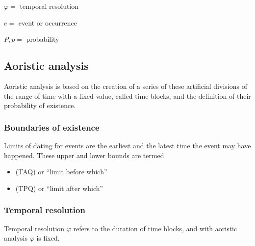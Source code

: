 \documentclass[a4paper,12pt,english]{sphinxhowto}
\begin{document}
\(\varphi =\) temporal resolution

\(e =\) event or occurrence

\(P, p =\) probability




\subsection{Aoristic analysis}
\label{\detokenize{Uncertainty:aoristic-analysis}}\label{\detokenize{Uncertainty:aora}}
Aoristic analysis is based on the creation of a series of these artificial divisions of
the range of time with a fixed value, called time blocks, and the definition of their probability of existence.



\subsubsection{Boundaries of existence}
\label{\detokenize{Uncertainty:boundaries-of-existence}}\label{\detokenize{Uncertainty:tapq}}
Limits of dating for events are the earliest and the latest time the event may have happened.
These upper and lower bounds are termed
\begin{itemize}
\item {} 
 (TAQ) or “limit before which”

\item {} 
 (TPQ) or “limit after which”

\end{itemize}



\subsubsection{Temporal resolution}
\label{\detokenize{Uncertainty:temporal-resolution}}
Temporal resolution \(\varphi\) refers to the duration of time blocks, and
with aoristic analysis \(\varphi\) is fixed.
\end{document}
